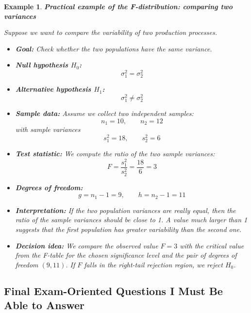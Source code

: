\documentclass[11pt]{article}
\theoremstyle{smallexample}
\newtheorem{example}{Example}[section]
\begin{document}
    \begin{example}{\textbf{Practical example of the F-distribution: comparing two variances}}

Suppose we want to compare the variability of two production processes.

\begin{itemize}
    \item \textbf{Goal:} Check whether the two populations have the same variance.

    \item \textbf{Null hypothesis \(H_0\):}
    \[
    \sigma_1^2=\sigma_2^2
    \]

    \item \textbf{Alternative hypothesis \(H_1\):}
    \[
    \sigma_1^2 \neq \sigma_2^2
    \]

    \item \textbf{Sample data:} Assume we collect two independent samples:
    \[
    n_1=10, \qquad n_2=12
    \]
    with sample variances
    \[
    s_1^2=18, \qquad s_2^2=6
    \]

    \item \textbf{Test statistic:} We compute the ratio of the two sample variances:
    \[
    F=\frac{s_1^2}{s_2^2}=\frac{18}{6}=3
    \]

    \item \textbf{Degrees of freedom:}
    \[
    g=n_1-1=9, \qquad h=n_2-1=11
    \]

    \item \textbf{Interpretation:} If the two population variances are really equal, then the ratio of the sample variances should be close to 1. A value much larger than 1 suggests that the first population has greater variability than the second one.

    \item \textbf{Decision idea:} We compare the observed value \(F=3\) with the critical value from the F-table for the chosen significance level and the pair of degrees of freedom \((9,11)\). If \(F\) falls in the right-tail rejection region, we reject \(H_0\).
\end{itemize}
\end{example}


\pagebreak
\subsection{Final Exam-Oriented Questions I Must Be Able to Answer}
\end{document}
